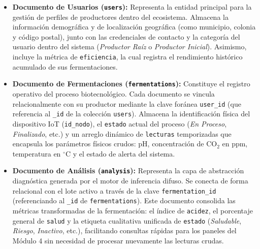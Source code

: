 \begin{itemize}
    \item \textbf{Documento de Usuarios (\texttt{users}):} Representa la entidad principal para la gestión de perfiles de productores dentro del ecosistema. Almacena la información demográfica y de localización geográfica (como municipio, colonia y código postal), junto con las credenciales de contacto y la categoría del usuario dentro del sistema (\textit{Productor Raíz} o \textit{Productor Inicial}). Asimismo, incluye la métrica de \texttt{eficiencia}, la cual registra el rendimiento histórico acumulado de sus fermentaciones.
    
    \item \textbf{Documento de Fermentaciones (\texttt{fermentations}):} Constituye el registro operativo del proceso biotecnológico. Cada documento se vincula relacionalmente con su productor mediante la clave foránea \texttt{user\_id} (que referencia al \texttt{\_id} de la colección \texttt{users}). Almacena la identificación física del dispositivo IoT (\texttt{id\_nodo}), el \texttt{estado} actual del proceso (\textit{En Proceso}, \textit{Finalizado}, etc.) y un arreglo dinámico de \texttt{lecturas} temporizadas que encapsula los parámetros físicos crudos: pH, concentración de $\text{CO}_2$ en ppm, temperatura en $^\circ\text{C}$ y el estado de alerta del sistema.
    
    \item \textbf{Documento de Análisis (\texttt{analysis}):} Representa la capa de abstracción diagnóstica generada por el motor de inferencia difuso. Se conecta de forma relacional con el lote activo a través de la clave \texttt{fermentation\_id} (referenciando al \texttt{\_id} de \texttt{fermentations}). Este documento consolida las métricas transformadas de la fermentación: el índice de \texttt{acidez}, el porcentaje general de \texttt{salud} y la etiqueta cualitativa unificada de \texttt{estado} (\textit{Saludable}, \textit{Riesgo}, \textit{Inactivo}, etc.), facilitando consultas rápidas para los paneles del Módulo 4 sin necesidad de procesar nuevamente las lecturas crudas.
\end{itemize}



